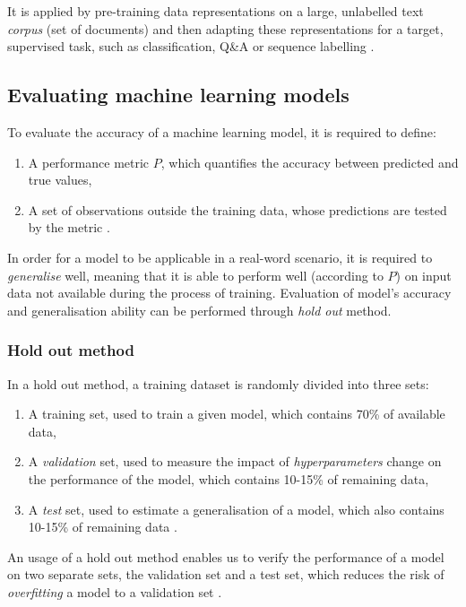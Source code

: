 It is applied by pre-training data representations on a large, unlabelled text \emph{corpus} (set of documents) and then adapting these representations for a target, supervised task, such as classification, Q\&A or sequence labelling \cite{state_of_nlp_2019}.

\subsection{Evaluating machine learning models}

To evaluate the accuracy of a machine learning model, it is required to define:

\begin{enumerate}
\item A performance metric $P$, which quantifies the accuracy between predicted and true values,
\item A set of observations outside the training data, whose predictions are tested by the metric \cite{howard:mechanicsofmachinelearning}.
\end{enumerate}

In order for a model to be applicable in a real-word scenario, it is required to \emph{generalise} well, meaning that it is able to perform well (according to $P$) on input data not available during the process of training. Evaluation of model's accuracy and generalisation ability can be performed through \emph{hold out} method.

\subsubsection{Hold out method}

In a hold out method, a training dataset is randomly divided into three sets:

\begin{enumerate}
\item A training set, used to train a given model, which contains 70\% of available data,
\item A \emph{validation} set, used to measure the impact of \emph{hyperparameters} change on the performance of the model, which contains 10-15\% of remaining data,
\item A \emph{test} set, used to estimate a generalisation of a model, which also contains 10-15\% of remaining data \cite{howard:mechanicsofmachinelearning}.
\end{enumerate}

An usage of a hold out method enables us to verify the performance of a model on two separate sets, the validation set and a test set, which reduces the risk of \emph{overfitting} a model to a validation set \cite{handson_geron}.

